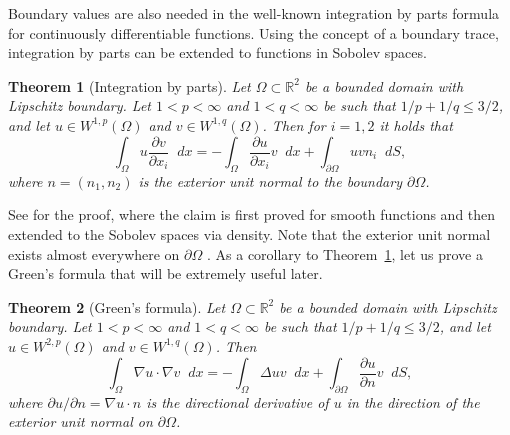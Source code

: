 \documentclass[english, 12pt, a4paper, sci, utf8, a-2b, online]{aaltothesis}
\theoremstyle{definition}
\theoremstyle{plain}
\newtheorem{theorem}{Theorem}[section]
\newcommand*\diff{\mathop{}\!d}
\numberwithin{equation}{section}
\begin{document}
Boundary values are also needed in the well-known integration by parts
formula for continuously differentiable functions.
Using the concept of a boundary trace,
integration by parts can be extended to functions in Sobolev spaces.
\begin{theorem}[Integration by parts]
    \label{thm:integrationbyparts}
    Let $\Omega \subset \mathbb{R}^2$ be a bounded domain with Lipschitz
    boundary. Let $1 < p < \infty$ and $1 < q < \infty$ be such that
    $1/p + 1/q \leq 3/2$, and let $u \in W^{1,p}(\Omega)$
    and $v \in W^{1,q}(\Omega)$. Then for $i=1,2$ it holds that
    \begin{equation*}
        \int_{\Omega} u \frac{\partial v}{\partial x_i} \diff x
        = - \int_{\Omega} \frac{\partial u}{\partial x_i} v \diff x
            + \int_{\partial \Omega} uv n_i \diff S,
    \end{equation*}
    where $n = (n_1, n_2)$ is the exterior unit normal
    to the boundary $\partial \Omega$.
\end{theorem}
See \cite[Theorem 1.1 on p.\ 117]{necas2011} for the proof,
where the claim is first proved for smooth functions and then
extended to the Sobolev spaces via density. Note that the exterior
unit normal exists almost everywhere on $\partial \Omega$
\cite[Lemma 4.2 on p.\ 83]{necas2011}.
As a corollary to Theorem~\ref{thm:integrationbyparts},
let us prove a Green's formula that will be extremely useful later.
\begin{theorem}[Green's formula]
    \label{thm:greensformula}
    Let $\Omega \subset \mathbb{R}^2$ be a bounded domain with Lipschitz
    boundary. Let $1 < p < \infty$ and $1 < q < \infty$ be such that
    $1/p + 1/q \leq 3/2$, and let $u \in W^{2,p}(\Omega)$
    and $v \in W^{1,q}(\Omega)$. Then
    \begin{equation*}
        \int_{\Omega} \nabla u \cdot \nabla v \diff x
        = -\int_{\Omega} \Delta u v \diff x
            + \int_{\partial \Omega} \frac{\partial u}{\partial n} v \diff S,
    \end{equation*}
    where $\partial u / \partial n = \nabla u \cdot n$ is the directional
    derivative of $u$ in the direction of the exterior
    unit normal on $\partial \Omega$.
\end{theorem}
\end{document}
